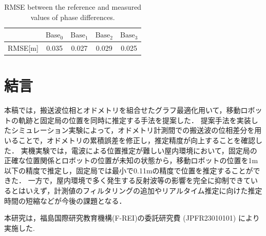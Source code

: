 \documentclass[a4jsme]{jsmepaper}
\begin{document}
\begin{table}[tb]
    \centering
    \caption{RMSE between the reference and measured values of phase differences.}
    \begin{tabular}{|c|c|c|c|c|}
    \hline
         &$\mathrm{Base}_0$  &$\mathrm{Base}_1$  &$\mathrm{Base}_2$  &$\mathrm{Base}_3$ \\\hline
     RMSE[m] & 0.035 & 0.027 & 0.029 & 0.025 \\
     \hline
    \end{tabular}
    \label{tab:vicon_vs_wiwi}
\end{table}

\section{結言}
本稿では，搬送波位相とオドメトリを組合せたグラフ最適化用いて，移動ロボットの軌跡と固定局の位置を同時に推定する手法を提案した．
提案手法を実装したシミュレーション実験によって，オドメトリ計測間での搬送波の位相差分を用いることで，オドメトリの累積誤差を修正し，推定精度が向上することを確認した．
実機実験では，電波による位置推定が難しい屋内環境において，固定局の正確な位置関係とロボットの位置が未知の状態から，移動ロボットの位置を1m以下の精度で推定し，固定局では最小で0.11mの精度で位置を推定することができた．
一方で，屋内環境で多く発生する反射波等の影響を完全に抑制できているとはいえず，計測値のフィルタリングの追加やリアルタイム推定に向けた推定時間の短縮などが今後の課題となる．

\begin{acknowledgements}
本研究は，福島国際研究教育機構(F-REI)の委託研究費 (JPFR23010101) により実施した.
\end{acknowledgements}


\end{document}
